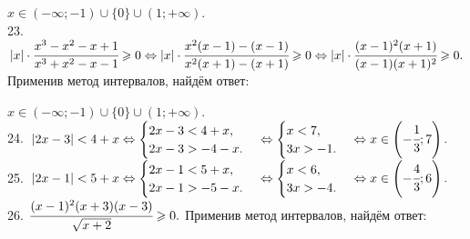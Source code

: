 \documentclass[12pt]{article}
\begin{document}
$x\in(-\infty;-1)\cup\{0\}\cup(1;+\infty).$\\
23. $|x|\cdot\cfrac{x^3-x^2-x+1}{x^3+x^2-x-1}\geqslant 0\Leftrightarrow|x|\cdot\cfrac{x^2(x-1)-(x-1)}{x^2(x+1)-(x+1)}\geqslant 0\Leftrightarrow
|x|\cdot\cfrac{(x-1)^2(x+1)}{(x-1)(x+1)^2}\geqslant 0.$
Применив метод интервалов, найдём ответ:
\begin{figure}[ht!]
\end{figure}
$x\in(-\infty;-1)\cup\{0\}\cup(1;+\infty).$\\
24. $|2x-3|<4+x\Leftrightarrow\begin{cases}2x-3<4+x,\\ 2x-3>-4-x.\end{cases}
\Leftrightarrow\begin{cases}x<7,\\ 3x>-1.\end{cases}\Leftrightarrow
x\in\left(-\cfrac{1}{3};7\right).$\\
25. $|2x-1|<5+x\Leftrightarrow\begin{cases}2x-1<5+x,\\ 2x-1>-5-x.\end{cases}
\Leftrightarrow\begin{cases}x<6,\\ 3x>-4.\end{cases}\Leftrightarrow x\in \left(-\cfrac{4}{3};6\right).$\\
26. $\cfrac{(x-1)^2(x+3)(x-3)}{\sqrt{x+2}}\geqslant0.$ Применив метод интервалов, найдём ответ:
\begin{figure}[ht!]
\end{figure}
\end{document}

